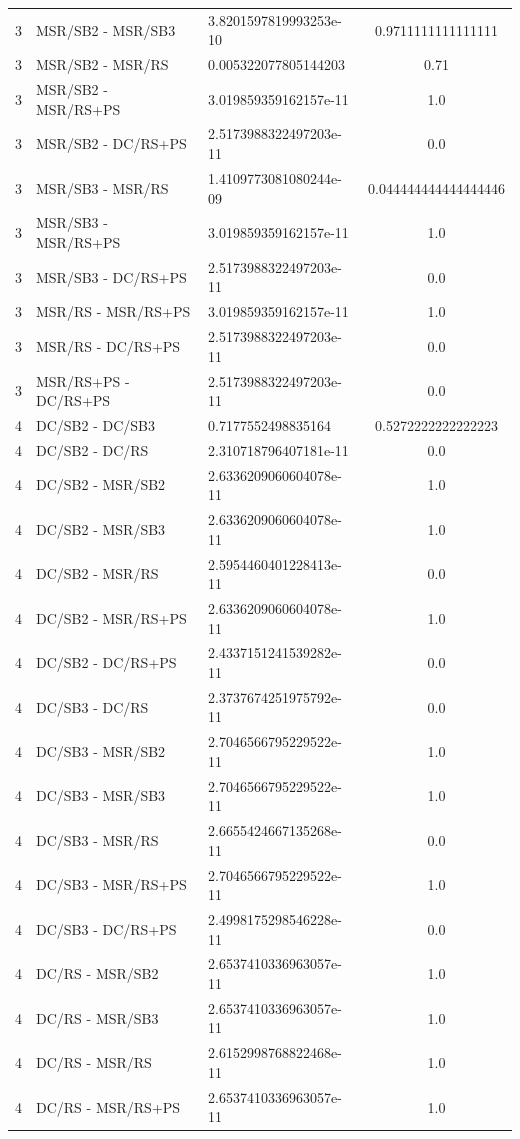 \documentclass[10pt,a4paper]{article}
\begin{document}
\begin{longtable}{c l l c}
3 & MSR/SB2 - MSR/SB3 & 3.8201597819993253e-10 & 0.9711111111111111 \\
3 & MSR/SB2 - MSR/RS & 0.005322077805144203 & 0.71 \\
3 & MSR/SB2 - MSR/RS+PS & 3.019859359162157e-11 & 1.0 \\
3 & MSR/SB2 - DC/RS+PS & 2.5173988322497203e-11 & 0.0 \\
3 & MSR/SB3 - MSR/RS & 1.4109773081080244e-09 & 0.044444444444444446 \\
3 & MSR/SB3 - MSR/RS+PS & 3.019859359162157e-11 & 1.0 \\
3 & MSR/SB3 - DC/RS+PS & 2.5173988322497203e-11 & 0.0 \\
3 & MSR/RS - MSR/RS+PS & 3.019859359162157e-11 & 1.0 \\
3 & MSR/RS - DC/RS+PS & 2.5173988322497203e-11 & 0.0 \\
3 & MSR/RS+PS - DC/RS+PS & 2.5173988322497203e-11 & 0.0 \\
\midrule
4 & DC/SB2 - DC/SB3 & 0.7177552498835164 & 0.5272222222222223 \\
4 & DC/SB2 - DC/RS & 2.310718796407181e-11 & 0.0 \\
4 & DC/SB2 - MSR/SB2 & 2.6336209060604078e-11 & 1.0 \\
4 & DC/SB2 - MSR/SB3 & 2.6336209060604078e-11 & 1.0 \\
4 & DC/SB2 - MSR/RS & 2.5954460401228413e-11 & 0.0 \\
4 & DC/SB2 - MSR/RS+PS & 2.6336209060604078e-11 & 1.0 \\
4 & DC/SB2 - DC/RS+PS & 2.4337151241539282e-11 & 0.0 \\
4 & DC/SB3 - DC/RS & 2.3737674251975792e-11 & 0.0 \\
4 & DC/SB3 - MSR/SB2 & 2.7046566795229522e-11 & 1.0 \\
4 & DC/SB3 - MSR/SB3 & 2.7046566795229522e-11 & 1.0 \\
4 & DC/SB3 - MSR/RS & 2.6655424667135268e-11 & 0.0 \\
4 & DC/SB3 - MSR/RS+PS & 2.7046566795229522e-11 & 1.0 \\
4 & DC/SB3 - DC/RS+PS & 2.4998175298546228e-11 & 0.0 \\
4 & DC/RS - MSR/SB2 & 2.6537410336963057e-11 & 1.0 \\
4 & DC/RS - MSR/SB3 & 2.6537410336963057e-11 & 1.0 \\
4 & DC/RS - MSR/RS & 2.6152998768822468e-11 & 1.0 \\
4 & DC/RS - MSR/RS+PS & 2.6537410336963057e-11 & 1.0 \\

\end{longtable}
\end{document}
